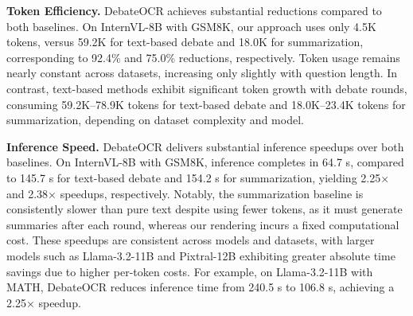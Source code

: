 \documentclass{article}
\theoremstyle{plain}
\theoremstyle{definition}
\theoremstyle{remark}
\begin{document}
\begin{table}[t]
\centering
\caption{Ablation study on image resolution on MATH with 5 rounds and 3 agents using Qwen2.5-VL-7B.}
\vspace{1mm}
\label{tab:resolution_ablation}
\end{table}


\textbf{Token Efficiency.}
DebateOCR achieves substantial reductions compared to both baselines. On InternVL-8B with GSM8K, our approach uses only 4.5K tokens, versus 59.2K for text-based debate and 18.0K for summarization, corresponding to 92.4\% and 75.0\% reductions, respectively. Token usage remains nearly constant across datasets, increasing only slightly with question length. In contrast, text-based methods exhibit significant token growth with debate rounds, consuming 59.2K–78.9K tokens for text-based debate and 18.0K–23.4K tokens for summarization, depending on dataset complexity and model. 


\textbf{Inference Speed.}
DebateOCR delivers substantial inference speedups over both baselines. On InternVL-8B with GSM8K, inference completes in 64.7 s, compared to 145.7 s for text-based debate and 154.2 s for summarization, yielding 2.25× and 2.38× speedups, respectively. Notably, the summarization baseline is consistently slower than pure text despite using fewer tokens, as it must generate summaries after each round, whereas our rendering incurs a fixed computational cost. These speedups are consistent across models and datasets, with larger models such as Llama-3.2-11B and Pixtral-12B exhibiting greater absolute time savings due to higher per-token costs. For example, on Llama-3.2-11B with MATH, DebateOCR reduces inference time from 240.5 s to 106.8 s, achieving a 2.25× speedup.
\end{document}
